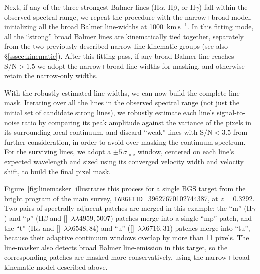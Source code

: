 \documentclass[modern,linenumbers]{aastex701}
\newcommand{\kms}{\ensuremath{\mathrm{km~s}^{-1}}}
\newcommand{\ha}{H\ensuremath{\alpha}}
\newcommand{\hb}{H\ensuremath{\beta}}
\newcommand{\hg}{H\ensuremath{\gamma}}
\newcommand{\oiiidoublet}{[\ion{O}{3}]~$\lambda\lambda4959,5007$}
\newcommand{\niidoublet}{[\ion{N}{2}]~$\lambda\lambda6548,84$}
\newcommand{\siidoublet}{[\ion{S}{2}]~$\lambda\lambda6716,31$}
\begin{document}
Next, if any of the three strongest Balmer lines (\ha, \hb, or \hg)
fall within the observed spectral range, we repeat the procedure with
the narrow+broad model, initializing all the broad Balmer line-widths
at 1000~\kms. In this fitting mode, all the ``strong'' broad Balmer
lines are kinematically tied together, separately from the two
previously described narrow-line kinematic groups (see also
\S\ref{sssec:kinematic}). After this fitting pass, if any broad Balmer
line reaches $\mathrm{S/N} > 1.5$ we adopt the narrow+broad
line-widths for masking, and otherwise retain the narrow-only widths.

With the robustly estimated line-widths, we can now build the complete
line-mask. Iterating over all the lines in the observed spectral range
(not just the initial set of candidate strong lines), we robustly
estimate each line's signal-to-noise ratio by comparing its peak
amplitude against the variance of the pixels in its surrounding local
continuum, and discard ``weak'' lines with $\mathrm{S/N} < 3.5$ from
further consideration, in order to avoid over-masking the continuum
spectrum. For the surviving lines, we adopt a
$\pm5\,\sigma_\mathrm{line}$ window, centered on each line's expected
wavelength and sized using its converged velocity width and velocity
shift, to build the final pixel mask.


Figure~\ref{fig:linemasker} illustrates this process for a single BGS
target from the bright program of the main survey,
\texttt{TARGETID}=39627670102744387, at $z=0.3292$. Two pairs of
spectrally adjacent patches are merged in this example: the ``m''
(H$\gamma$) and ``p'' (\hb{} and \oiiidoublet) patches merge into a
single ``mp'' patch, and the ``t'' (\ha{} and \niidoublet) and ``u''
(\siidoublet) patches merge into ``tu'', because their adaptive
continuum windows overlap by more than 11 pixels. The line-masker also
detects broad Balmer line-emission in this target, so the
corresponding patches are masked more conservatively, using the
narrow+broad kinematic model described above.

\end{document}
